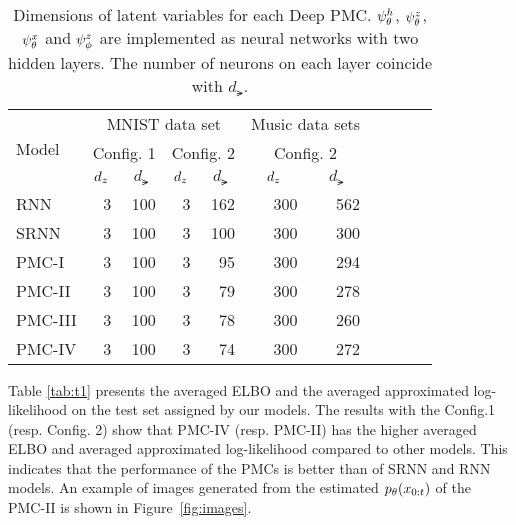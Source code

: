 \begin{table}
    \begin{center}
        \begin{tabular}{|l|r|r|r|r|r|r|r|r|r|r|}
        \hline
        \multirow{3}{*}{Model}  &\multicolumn{4}{c|}{MNIST data set}  &\multicolumn{2}{c|}{\!\!Music data sets\!\!} \\
        \cline{2-7}
           &\multicolumn{2}{c|}{Config. 1} &\multicolumn{2}{c|}{Config. 2} &\multicolumn{2}{c|}{Config. 2}  \\
        \cline{2-7}
         & \multicolumn{1}{c|}{$d_{z}$} & \multicolumn{1}{c|}{$d_{\lat}$}  & \multicolumn{1}{c|}{$d_{z}$} & \multicolumn{1}{c|}{$d_{\lat}$}   & \multicolumn{1}{c|}{$d_{z}$} & \multicolumn{1}{c|}{$d_{\lat}$}  
        \\ \hline \hline
        RNN     & 3 & 100 & 3 & 162 & 300 & 562  \\ %
        SRNN    & 3 & 100 & 3 & 100 & 300 & 300  \\ %
        PMC-I   & 3 & 100 & 3 & 95 & 300 & 294  \\ %
        PMC-II  & 3 & 100 & 3 & 79 & 300 & 278  \\ %
        PMC-III & 3 & 100 & 3 & 78 & 300 & 260 \\ %
        PMC-IV  & 3 & 100 & 3 & 74 & 300 & 272  \\ \hline
        \end{tabular}    
        \end{center}
        \caption{Dimensions of latent variables for each Deep PMC.  
        $\psi^{h}_{\theta}$, $\psi^{z}_{\theta}$, $\psi^{x}_{\theta}$  and $\psi^{z}_{\phi}$ are implemented as 
        neural networks with two hidden layers. 
        The number of neurons on each layer coincide with $d_{\lat}$.}        
    \label{tab:config}
\end{table}

Table \ref{tab:t1} presents the averaged ELBO 
and the averaged approximated log-likelihood  on the test set assigned by our models.
The results with the Config.1 (resp. Config. 2) 
show that PMC-IV (resp. PMC-II) has the higher averaged ELBO and 
averaged approximated log-likelihood compared to other models.
This indicates that the performance of the PMCs is better than of SRNN and RNN models.
An example of images generated from the estimated $p_{\theta}(x_{0:t})$ of the PMC-II 
is shown in Figure~\ref{fig:images}.
  
